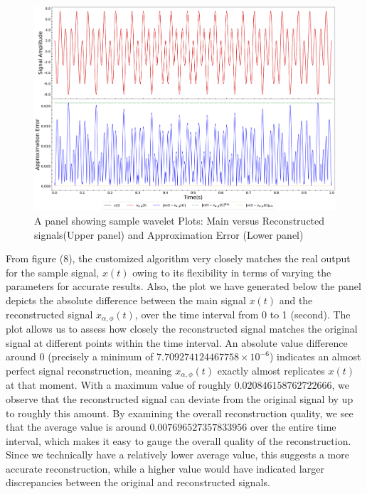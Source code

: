 \documentclass{article}
\begin{document}
\begin{figure}[h]
    \centering
    \includegraphics[width=0.8\linewidth]{waveTransform_main_reconstructed.png}
    \caption{A panel showing sample wavelet Plots: Main versus Reconstructed signals(Upper panel) and Approximation Error (Lower panel)}
    \label{fig:enter-label}
\end{figure}

From figure (8), the customized algorithm very closely matches the real output for the sample signal, $x(t)$ owing to its flexibility in terms of varying the parameters for accurate results. Also, the plot we have generated below the panel depicts the absolute difference between the main signal $x(t)$ and the reconstructed signal $x_{\alpha,\phi}(t)$, over the time interval from 0 to 1 (second). The plot allows us to assess how closely the reconstructed signal matches the original signal at different points within the time interval. An absolute value difference around 0 (precisely a minimum of $7.709274124467758 \times 10^{-6}$) indicates an almost perfect signal reconstruction, meaning $x_{\alpha,\phi}(t)$ exactly almost replicates $x(t)$ at that moment. With a maximum value of roughly $0.020846158762722666$, we observe that the reconstructed signal can deviate from the original signal by up to roughly this amount. By examining the overall reconstruction quality, we see that the average value is around $0.007696527357833956$ over the entire time interval, which makes it easy to gauge the overall quality of the reconstruction. Since we technically have a relatively lower average value, this suggests a more accurate reconstruction, while a higher value would have indicated larger discrepancies between the original and reconstructed signals.
\end{document}
